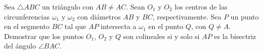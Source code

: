 Sea $\triangle ABC$ un triángulo con $AB\neq AC$. Sean $O_1$ y $O_2$ los centros de las circunferencias $\omega_1$ y $\omega_2$ con diámetros $AB$ y $BC$, respectivamente. Sea $P$ un punto en el segmento $BC$ tal que $AP$ intersecta a $\omega_1$ en el punto $Q$, con $Q\neq A$. Demostrar que los puntos $O_1$, $O_2$ y $Q$ son colineales si y solo si $AP$ es la bisectriz del ángulo $\angle BAC$.
